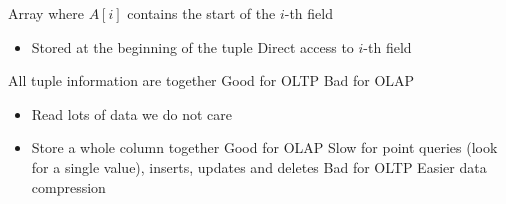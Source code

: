 \begin{itemize}
\begin{itemize}
\begin{itemize}
\begin{itemize}
\begin{itemize}
                                \end{itemize}
                             Array where $A[i]$ contains the start of the $i$-th field
                                \begin{itemize}
                                    \item Stored at the beginning of the tuple
                                    \ipro Direct access to $i$-th field
                                \end{itemize}
                        \end{itemize}
                \end{itemize}
            \ipro All tuple information are together
            \ipro Good for OLTP
            \icon Bad for OLAP
                \begin{itemize}
                    \item Read lots of data we do not care
                \end{itemize}
        \end{itemize}
        \begin{itemize}
            \item Store a whole column together
            \ipro Good for OLAP
            \icon Slow for point queries (look for a single value), inserts, updates and deletes
            \icon Bad for OLTP
            \ipro Easier data compression
        \end{itemize}
\end{itemize}

